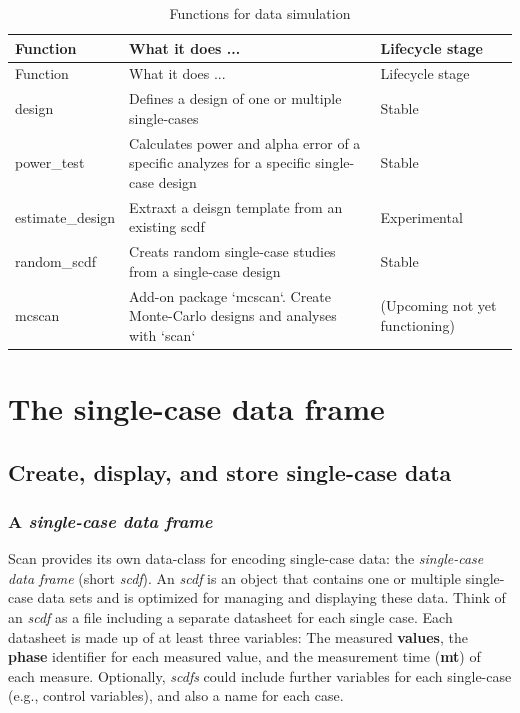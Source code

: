 \documentclass[
  letterpaper,
  DIV=11,
  numbers=noendperiod]{scrreprt}
\begin{document}
\hypertarget{tbl-functions-simulation}{}
\begin{longtable}[]{@{}lll@{}}
\caption{\label{tbl-functions-simulation}Functions for data
simulation}\tabularnewline
\toprule()
Function & What it does ... & Lifecycle stage \\
\midrule()
\endfirsthead
\toprule()
Function & What it does ... & Lifecycle stage \\
\midrule()
\endhead
design & Defines a design of one or multiple single-cases & Stable \\
power\_test & Calculates power and alpha error of a specific analyzes
for a specific single-case design & Stable \\
estimate\_design & Extraxt a deisgn template from an existing scdf &
Experimental \\
random\_scdf & Creats random single-case studies from a single-case
design & Stable \\
mcscan & Add-on package `mcscan`. Create Monte-Carlo designs and
analyses with `scan` & (Upcoming not yet functioning) \\
\bottomrule()
\end{longtable}

\part{The single-case data frame}

\hypertarget{create-display-and-store-single-case-data}{%
\chapter{Create, display, and store single-case
data}\label{create-display-and-store-single-case-data}}

\hypertarget{a-single-case-data-frame}{%
\section{\texorpdfstring{A \textbf{\emph{single-case data
frame}}}{A single-case data frame}}\label{a-single-case-data-frame}}

Scan provides its own data-class for encoding single-case data: the
\emph{single-case data frame} (short \emph{scdf}). An \emph{scdf} is an
object that contains one or multiple single-case data sets and is
optimized for managing and displaying these data. Think of an
\emph{scdf} as a file including a separate datasheet for each single
case. Each datasheet is made up of at least three variables: The
measured \textbf{values}, the \textbf{phase} identifier for each
measured value, and the measurement time (\textbf{mt}) of each measure.
Optionally, \emph{scdfs} could include further variables for each
single-case (e.g., control variables), and also a name for each case.
\end{document}
